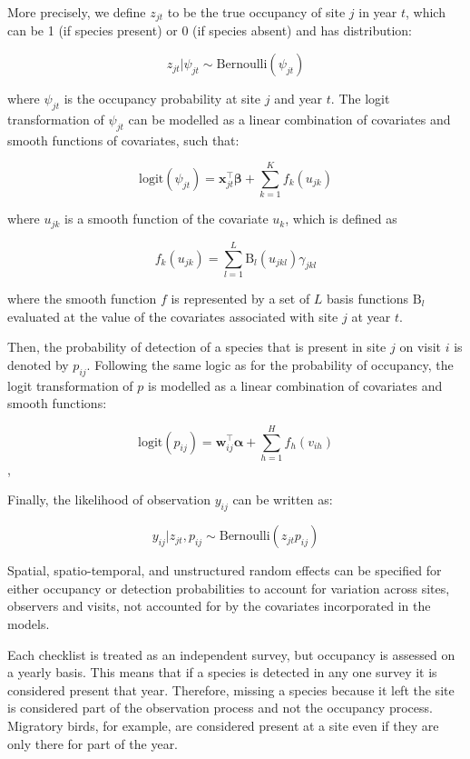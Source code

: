 \documentclass[utf8]{frontiersSCNS}
\begin{document}
More precisely, we define \(z_{jt}\) to be the true occupancy of site
\(j\) in year \(t\), which can be 1 (if species present) or 0 (if
species absent) and has distribution:

\[z_{jt}|\psi_{jt} \sim \textrm{Bernoulli}(\psi_{jt})\]

where \(\psi_{jt}\) is the occupancy probability at site \(j\) and year
\(t\). The logit transformation of \(\psi_{jt}\) can be modelled as a
linear combination of covariates and smooth functions of covariates,
such that:

\[\textrm{logit}(\psi_{jt}) = \boldsymbol{x}_{jt}^\intercal \boldsymbol{\beta} + \sum_{k=1}^K f_k(u_{jk})\]

where \(u_{jk}\) is a smooth function of the covariate \(u_k\), which is
defined as

\[f_k(u_{jk}) = \sum_{l=1}^L \textrm{B}_l(u_{jkl})\gamma_{jkl}\]

where the smooth function \(f\) is represented by a set of \(L\) basis
functions \(\textrm{B}_l\) evaluated at the value of the covariates
associated with site \(j\) at year \(t\).

Then, the probability of detection of a species that is present in site
\(j\) on visit \(i\) is denoted by \(p_{ij}\). Following the same logic
as for the probability of occupancy, the logit transformation of \(p\)
is modelled as a linear combination of covariates and smooth functions:

\[\textrm{logit}(p_{ij})= \boldsymbol{w}_{ij}^\intercal \boldsymbol{\alpha} + \sum_{h=1}^H f_h(v_{ih})\],

Finally, the likelihood of observation \(y_{ij}\) can be written as:

\[y_{ij}|z_{jt},p_{ij} \sim \textrm{Bernoulli}(z_{jt}p_{ij})\]

Spatial, spatio-temporal, and unstructured random effects can be
specified for either occupancy or detection probabilities to account for
variation across sites, observers and visits, not accounted for by the
covariates incorporated in the models.

Each checklist is treated as an independent survey, but occupancy is
assessed on a yearly basis. This means that if a species is detected in
any one survey it is considered present that year. Therefore, missing a
species because it left the site is considered part of the observation
process and not the occupancy process. Migratory birds, for example, are
considered present at a site even if they are only there for part of the
year.
\end{document}
